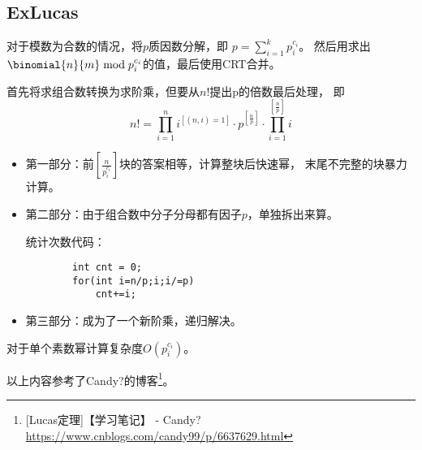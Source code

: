 \subsection{ExLucas}
对于模数为合数的情况，将$p$质因数分解，即
$\displaystyle p=\sum_{i=1}^k{p_i^{c_i}}$。
然后用求出$\binomial{n}{m} \bmod{p_i^{c_i}}$的值，最后使用CRT合并。

首先将求组合数转换为求阶乘，但要从$n!$提出p的倍数最后处理，
即\begin{displaymath}
	n!=\prod_{i=1}^n{i^{[(n,i)=1]}}\cdot p^{[\frac{n}{p}]}\cdot
	\prod_{i=1}^{[\frac{n}{p}]}i
\end{displaymath}
\begin{itemize}
	\item 第一部分：前$[\frac{n}{p_i^{c_i}}]$块的答案相等，计算整块后快速幂，
	      末尾不完整的块暴力计算。
	\item 第二部分：由于组合数中分子分母都有因子$p$，单独拆出来算。

	统计次数代码：
	\begin{lstlisting}
		int cnt = 0;
		for(int i=n/p;i;i/=p)
			cnt+=i;
	\end{lstlisting}
	\item 第三部分：成为了一个新阶乘，递归解决。
\end{itemize}
对于单个素数幂计算复杂度$O(p_i^{c_i})$。

以上内容参考了Candy?的博客\footnote{[Lucas定理]【学习笔记】 - Candy?
	\url{https://www.cnblogs.com/candy99/p/6637629.html}}。
